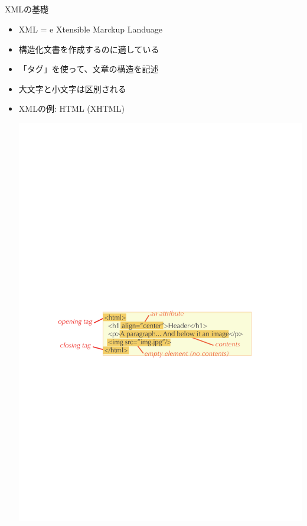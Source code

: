 \subsection*{\redm\whitem\greenb}
\begin{frame}{XMLの基礎}
  \begin{itemize}
  \item XML = e{\color{red} X}tensible {\color{red} M}arckup {\color{red} L}anduage
  \item 構造化文書を作成するのに適している
  \item 「タグ」を使って、文章の構造を記述
  \item 大文字と小文字は区別される
  \item XMLの例: HTML (XHTML)
  \begin{center}
    \includegraphics[height=0.3\textheight]{xml1.pdf}
  \end{center}
  \end{itemize}
\end{frame}


